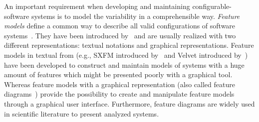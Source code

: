 An important requirement when developing and maintaining configurable-software systems is to model the variability in a comprehensible way. 
\textit{Feature models} define a common way to describe all valid configurations of software systems~\cite{kang1990feature,czarnecki2000generative, apel2016feature}. 
They have been introduced by~\cite{kang1990feature} and are usually realized with two different representations: textual notations and graphical representations. 
Feature models in textual from (e.g., SXFM introduced by~\cite{Mendonca2009SSP} and Velvet introduced by~\cite{rosenmuller2011multi}) have been developed to construct and maintain models of systems with a huge amount of features which might be presented poorly with a graphical tool. 
Whereas feature models with a graphical representation (also called feature diagrams~\cite{kang1990feature}) provide the possibility to create and manipulate feature models through a graphical user interface. 
Furthermore, feature diagrams are widely used in scientific literature to present analyzed systems. 


